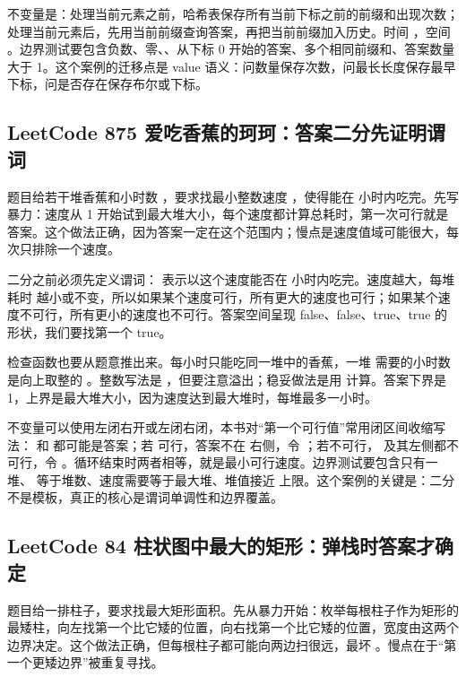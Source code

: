 不变量是：处理当前元素之前，哈希表保存所有当前下标之前的前缀和出现次数；处理当前元素后，先用当前前缀查询答案，再把当前前缀加入历史。时间 ，空间 。边界测试要包含负数、零、、从下标 0 开始的答案、多个相同前缀和、答案数量大于 1。这个案例的迁移点是 value 语义：问数量保存次数，问最长长度保存最早下标，问是否存在保存布尔或下标。

\subsection{LeetCode 875 爱吃香蕉的珂珂：答案二分先证明谓词}

题目给若干堆香蕉和小时数 ，要求找最小整数速度 ，使得能在  小时内吃完。先写暴力：速度从 1 开始试到最大堆大小，每个速度都计算总耗时，第一次可行就是答案。这个做法正确，因为答案一定在这个范围内；慢点是速度值域可能很大，每次只排除一个速度。

二分之前必须先定义谓词： 表示以这个速度能否在  小时内吃完。速度越大，每堆耗时  越小或不变，所以如果某个速度可行，所有更大的速度也可行；如果某个速度不可行，所有更小的速度也不可行。答案空间呈现 false、false、true、true 的形状，我们要找第一个 true。

检查函数也要从题意推出来。每小时只能吃同一堆中的香蕉，一堆  需要的小时数是向上取整的 。整数写法是 ，但要注意溢出；稳妥做法是用  计算。答案下界是 1，上界是最大堆大小，因为速度达到最大堆时，每堆最多一小时。

不变量可以使用左闭右开或左闭右闭，本书对“第一个可行值”常用闭区间收缩写法： 和  都可能是答案；若  可行，答案不在  右侧，令 ；若不可行， 及其左侧都不可行，令 。循环结束时两者相等，就是最小可行速度。边界测试要包含只有一堆、 等于堆数、速度需要等于最大堆、堆值接近  上限。这个案例的关键是：二分不是模板，真正的核心是谓词单调性和边界覆盖。

\subsection{LeetCode 84 柱状图中最大的矩形：弹栈时答案才确定}

题目给一排柱子，要求找最大矩形面积。先从暴力开始：枚举每根柱子作为矩形的最矮柱，向左找第一个比它矮的位置，向右找第一个比它矮的位置，宽度由这两个边界决定。这个做法正确，但每根柱子都可能向两边扫很远，最坏 。慢点在于“第一个更矮边界”被重复寻找。


